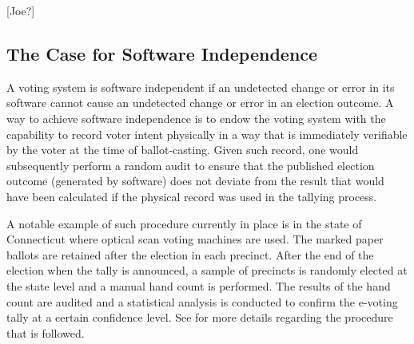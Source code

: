 [Joe?]

\subsection{The Case for Software Independence}

A voting system is software independent if an undetected change or
error in its software cannot cause an undetected change or error in an
election outcome.  A way to achieve software independence is to endow
the voting system with the capability to record voter intent
physically in a way that is immediately verifiable by the voter at the
time of ballot-casting. Given such record, one would subsequently
perform a random audit to ensure that the published election outcome
(generated by software) does not deviate from the result that would
have been calculated if the physical record was used in the tallying
process.

A notable example of such procedure currently in place is in the state
of Connecticut where optical scan voting machines are used. The marked
paper ballots are retained after the election in each precinct. After
the end of the election when the tally is announced, a sample of
precincts is randomly elected at the state level and a manual hand
count is performed. The results of the hand count are audited and a
statistical analysis is conducted to confirm the e-voting tally at a
certain confidence level.  See \cite{connecticut-audit} for more
details regarding the procedure that is followed.




